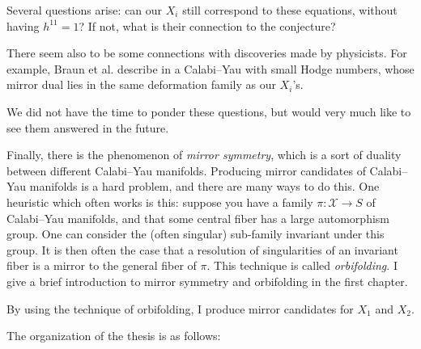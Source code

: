 Several questions arise: can our $X_i$ still correspond to these equations, without having $h^{11}=1$? If not, what is their connection to the conjecture?

There seem also to be some connections with discoveries made by physicists. For example, Braun et al. describe in \cite{braun_smallhodgenumbers} a Calabi--Yau with small Hodge numbers, whose mirror dual lies in the same deformation family as our $X_i$'s.

We did not have the time to ponder these questions, but would very much like to see them answered in the future.



\hfill \break

Finally, there is the phenomenon of \emph{mirror symmetry}, which is a sort of duality between different Calabi--Yau manifolds. Producing mirror candidates of Calabi--Yau manifolds is a hard problem, and there are many ways to do this. One heuristic which often works is this: suppose you have a family $\pi: \mathscr X \to S$ of Calabi--Yau manifolds, and that some central fiber has a large automorphism group. One can consider the (often singular) sub-family invariant under this group. It is then often the case that a resolution of singularities of an invariant fiber is a mirror to the general fiber of $\pi$. This technique is called \emph{orbifolding}. I give a brief introduction to mirror symmetry and orbifolding in the first chapter.

By using the technique of orbifolding, I produce mirror candidates for $X_1$ and $X_2$.

\hfill \break

The organization of the thesis is as follows:


